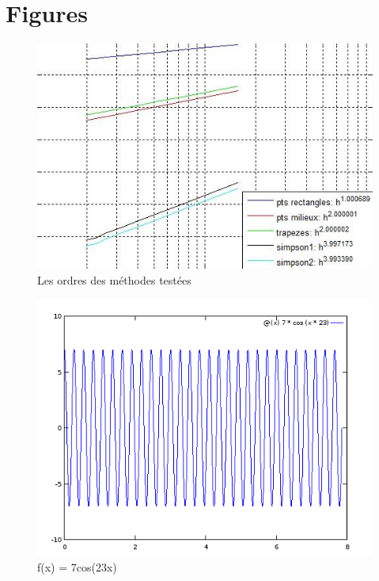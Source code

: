 \documentclass[a4paper,10pt]{article}
\begin{document}
\clearpage
\section{Figures}
\begin{figure}[h!]
    \centering
    \includegraphics[scale=0.7]{./img/methods-order.jpeg}
    \caption{Les ordres des méthodes testées}
    \label{fig:order}
\end{figure}

\vspace*{2cm}

\begin{figure}[h!]
    \centering
    \includegraphics[scale=0.7]{./img/oscillant.png}
    \caption{f(x) = 7cos(23x)}
    \label{fig:osc}
\end{figure}
\end{document}
